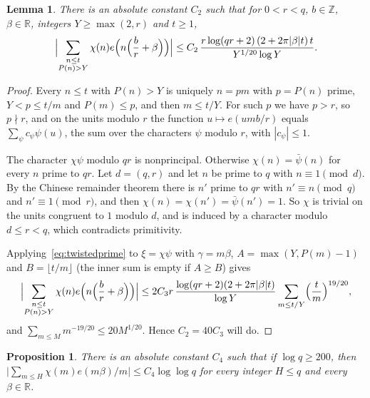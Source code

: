 \documentclass[12pt]{amsart}
\numberwithin{equation}{section}
\newtheorem{lemma}[theorem]{Lemma}
\newtheorem{proposition}[theorem]{Proposition}
\theoremstyle{definition}
\newcommand{\R}{\mathbb{R}}
\newcommand{\Z}{\mathbb{Z}}
\begin{document}
\begin{lemma}\label{lem:major}
There is an absolute constant $C_2$ such that for $0<r<q$, $b\in\Z$, $\beta\in\R$, integers
$Y\ge\max(2,r)$ and $t\ge1$,
\[
  \Bigl|\sum_{\substack{n\le t\\P(n)>Y}}\chi(n)e\Bigl(n\Bigl(\frac br+\beta\Bigr)\Bigr)\Bigr|
  \le C_2\,\frac{r\log(qr+2)\,(2+2\pi|\beta|t)\,t}{Y^{1/20}\log Y}.
\]
\end{lemma}

\begin{proof}
Every $n\le t$ with $P(n)>Y$ is uniquely $n=pm$ with $p=P(n)$ prime, $Y<p\le t/m$ and
$P(m)\le p$, and then $m\le t/Y$. For such $p$ we have $p>r$, so $p\nmid r$, and on the units
modulo $r$ the function $u\mapsto e(umb/r)$ equals $\sum_\psi c_\psi\psi(u)$, the sum over the
characters $\psi$ modulo $r$, with $|c_\psi|\le1$.

The character $\chi\psi$ modulo $qr$ is nonprincipal. Otherwise $\chi(n)=\bar\psi(n)$ for every
$n$ prime to $qr$. Let $d=(q,r)$ and let $n$ be prime to $q$ with $n\equiv1\pmod d$. By the
Chinese remainder theorem there is $n'$ prime to $qr$ with $n'\equiv n\pmod q$ and
$n'\equiv1\pmod r$, and then $\chi(n)=\chi(n')=\bar\psi(n')=1$. So $\chi$ is trivial on the
units congruent to $1$ modulo $d$, and is induced by a character modulo $d\le r<q$, which
contradicts primitivity.

Applying~\eqref{eq:twistedprime} to $\xi=\chi\psi$ with $\gamma=m\beta$,
$A=\max(Y,P(m)-1)$ and $B=\lfloor t/m\rfloor$ (the inner sum is empty if $A\ge B$) gives
\[
  \Bigl|\sum_{\substack{n\le t\\P(n)>Y}}\chi(n)e\Bigl(n\Bigl(\frac br+\beta\Bigr)\Bigr)\Bigr|
  \le2C_3r\,\frac{\log(qr+2)(2+2\pi|\beta|t)}{\log Y}\sum_{m\le t/Y}\Bigl(\frac tm\Bigr)^{19/20},
\]
and $\sum_{m\le M}m^{-19/20}\le20M^{1/20}$. Hence $C_2=40C_3$ will do.
\end{proof}

\begin{proposition}\label{prop:hsum}
There is an absolute constant $C_4$ such that if $\log q\ge200$, then
$\bigl|\sum_{m\le H}\chi(m)e(m\beta)/m\bigr|\le C_4\log\log q$ for every integer $H\le q$ and
every $\beta\in\R$.
\end{proposition}
\end{document}
